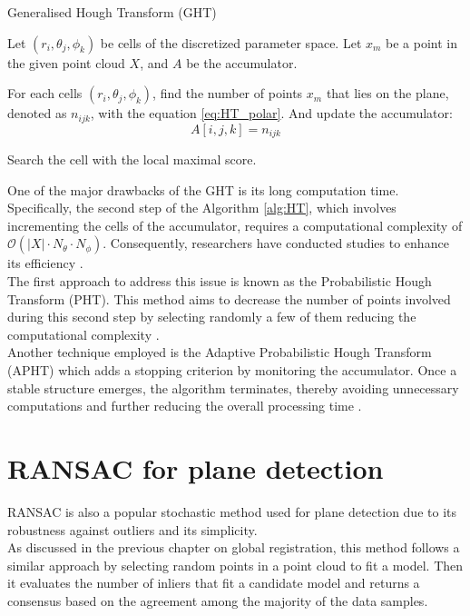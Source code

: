 \begin{algorithm}[ht]
\caption{Generalised Hough Transform (GHT)}\label{alg:HT}
\begin{description}[leftmargin=!, labelwidth=\widthof{\textbf{Step1: }}]
    \item [Step 1] Let $(r_i, \theta_j, \phi_k)$ be cells of the discretized parameter space. Let $x_m$ be a point in the given point cloud $X$, and $A$ be the accumulator. 
    \item [Step 2] For each cells $(r_i, \theta_j, \phi_k)$, find the number of points $x_m$ that lies on the plane, denoted as $n_{ijk}$, with the equation  \ref{eq:HT_polar}. And update the accumulator:
        \[
            A[i,j,k] = n_{ijk}
        \]
    \item [Step 3] Search the cell with the local maximal score.
\end{description}
\end{algorithm}


One of the major drawbacks of the GHT is its long computation time. Specifically, the second step of the Algorithm \ref{alg:HT}, which involves incrementing the cells of the accumulator, requires a computational complexity of $\mathcal{O}(|X| \cdot N_\theta \cdot N_\phi)$. Consequently, researchers have conducted studies to enhance its efficiency \cite{hough3d}.\\

The first approach to address this issue is known as the Probabilistic Hough Transform (PHT). This method aims to decrease the number of points involved during this second step by selecting randomly a few of them reducing the computational complexity \cite{probaHT}.\\

Another technique employed is the Adaptive Probabilistic Hough Transform (APHT) which adds a stopping criterion by monitoring the accumulator. Once a stable structure emerges, the algorithm terminates, thereby avoiding unnecessary computations and further reducing the overall processing time \cite{adaptiveprobaHT}.

\section{RANSAC for plane detection}
RANSAC is also a popular stochastic method used for plane detection due to its robustness against outliers and its simplicity.\\

As discussed in the previous chapter on global registration, this method follows a similar approach by selecting random points in a point cloud to fit a model. Then it evaluates the number of inliers that fit a candidate model and returns a consensus  based on the agreement among the majority of the data samples.\\

